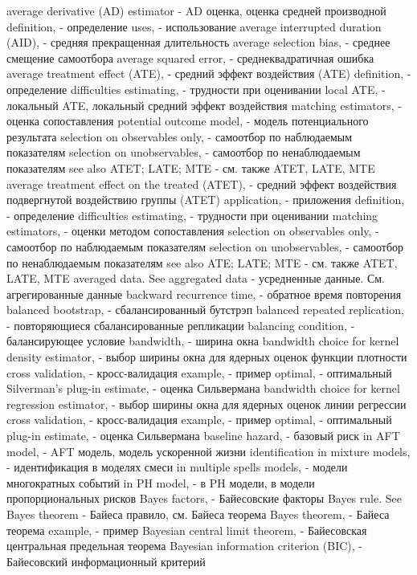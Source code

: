 average derivative (AD) estimator - AD оценка, оценка средней производной
definition, - определение
uses, - использование
average interrupted duration (AID), - средняя прекращенная длительность
average selection bias, - среднее смещение самоотбора
average squared error, - среднеквадратичная ошибка
average treatment effect (ATE), - средний эффект воздействия (ATE)
definition, - определение
difficulties estimating, - трудности при оценивании
local ATE, - локальный ATE, локальный средний эффект воздействия
matching estimators, - оценка сопоставления
potential outcome model, - модель потенциального результата
selection on observables only, - самоотбор по наблюдаемым показателям
selection on unobservables, - самоотбор по ненаблюдаемым показателям
see also ATET; LATE; MTE - см. также ATET, LATE, MTE
average treatment effect on the treated (ATET), - средний эффект воздействия подвергнутой воздействию группы (ATET)
application, - приложения
definition, - определение
difficulties estimating, - трудности при оценивании
matching estimators, - оценки методом сопоставления
selection on observables only, - самоотбор по наблюдаемым показателям
selection on unobservables, - самоотбор по ненаблюдаемым показателям
see also ATE; LATE; MTE - см. также ATET, LATE, MTE
averaged data. See aggregated data - усредненные данные. См. агрегированные данные
backward recurrence time, - обратное время повторения
balanced bootstrap, - сбалансированный бутстрэп
balanced repeated replication, - повторяющиеся сбалансированные репликации
balancing condition, - балансирующее условие
bandwidth, - ширина окна
bandwidth choice for kernel density estimator, - выбор ширины окна для ядерных оценок функции плотности
cross validation, - кросс-валидация
example, - пример
optimal, - оптимальный
Silverman’s plug-in estimate, - оценка Сильвермана
bandwidth choice for kernel regression estimator, - выбор ширины окна для ядерных оценок линии регрессии
cross validation, - кросс-валидация
example, - пример
optimal, - оптимальный
plug-in estimate, - оценка Сильвермана
baseline hazard, - базовый риск
in AFT model, - AFT модель, модель ускоренной жизни
identification in mixture models, - идентификация в моделях смеси
in multiple spells models, - модели многократных событий
in PH model, - в PH модели, в модели пропорциональных рисков
Bayes factors, - Байесовские факторы
Bayes rule. See Bayes theorem - Байеса правило, см. Байеса теорема
Bayes theorem, - Байеса теорема
example, - пример
Bayesian central limit theorem, - Байесовская центральная предельная теорема
Bayesian information criterion (BIC), - Байесовский информационный критерий
